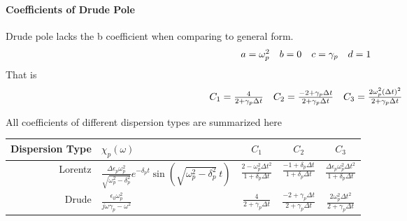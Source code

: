 \paragraph{\msjh Coefficients of Drude Pole}
Drude pole lacks the b coefficient when comparing to general form.
\begin{equation*}
  \begin{array}{@{}llll@{}}
    a = \omega_p^2 &
    b = 0 &
    c = \gamma_p &
    d = 1
  \end{array}
\end{equation*}
That is 
\begin{gather*}
  \begin{array}{@{}lll@{}}
    C_1 = \frac{4}{2+ \gamma_p\Delta t} &
    C_2 = \frac{-2+\gamma_p\Delta t}{2+\gamma_p\Delta t} &
    C_3 = \frac{2\omega_p^2(\Delta t)^2}{2+\gamma_p\Delta t}
  \end{array}
\end{gather*}





All coefficients of different dispersion types are summarized here
\begin{center}
  \begin{tabular}[c]{|r|l|c|c|c|}
    \hline
    Dispersion Type & $\chi_p(\omega)$ & $C_1$ & $C_2$ & $C_3$ \\
    \hline
    Lorentz & $\frac{\Delta \epsilon_p \omega_p^2}{\sqrt{\omega_p^2 - \delta_p^2}}e^{-\delta_p t}\sin\left(\sqrt{\omega_p^2-\delta_p^2}\ t\right)$ & $\frac{2-\omega_p^2\Delta t^2}{1+\delta_p\Delta t}$ & $\frac{-1 + \delta_p\Delta t}{1+\delta_p\Delta t}$  & $\frac{\Delta\epsilon_p\omega_p^2\Delta t^2}{1+\delta_p\Delta t}$ \\
    \hline
    Drude & $\frac{\epsilon_0\omega_p^2}{j\omega\gamma_p-\omega^2}$ & $\frac{ 4}{ 2+\gamma_p\Delta t}$ & $\frac{ -2+\gamma_p\Delta t}{ 2+\gamma_p\Delta t}$ & $\frac{ 2\omega_p^2\Delta t^2}{ 2+\gamma_p \Delta t}$\\
    \hline
  \end{tabular}
\end{center}


